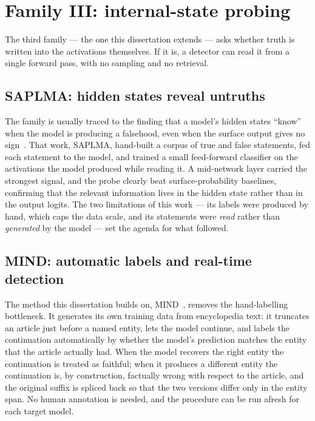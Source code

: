\section{Family III: internal-state probing}
\label{sec:internal}

The third family --- the one this dissertation extends --- asks whether truth is written
into the activations themselves. If it is, a detector can read it from a single forward
pass, with no sampling and no retrieval.

\subsection{SAPLMA: hidden states reveal untruths}

The family is usually traced to the finding that a model's hidden states ``know'' when
the model is producing a falsehood, even when the surface output gives no
sign~\cite{azaria2023saplma}. That work, SAPLMA, hand-built a corpus of true and false
statements, fed each statement to the model, and trained a small feed-forward classifier
on the activations the model produced while reading it. A mid-network layer carried the
strongest signal, and the probe clearly beat surface-probability baselines, confirming
that the relevant information lives in the hidden state rather than in the output logits.
The two limitations of this work --- its labels were produced by hand, which caps the
data scale, and its statements were \emph{read} rather than \emph{generated} by the model
--- set the agenda for what followed.

\subsection{MIND: automatic labels and real-time detection}

The method this dissertation builds on, MIND~\cite{su2024mind}, removes the hand-labelling
bottleneck. It generates its own training data from encyclopedia text: it truncates an
article just before a named entity, lets the model continue, and labels the continuation
automatically by whether the model's prediction matches the entity that the article
actually had. When the model recovers the right entity the continuation is treated as
faithful; when it produces a different entity the continuation is, by construction,
factually wrong with respect to the article, and the original suffix is spliced back so
that the two versions differ only in the entity span. No human annotation is needed, and
the procedure can be run afresh for each target model.

